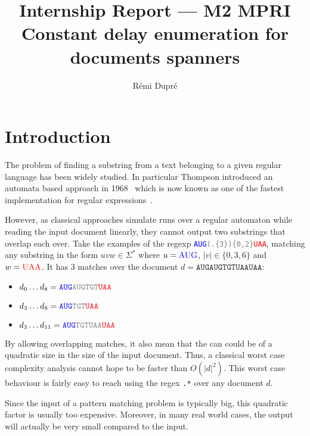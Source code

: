 \documentclass[12px]{article}
\title{%
  Internship Report --- M2 MPRI \\
  Constant delay enumeration for documents spanners
}
\author{Rémi Dupré}
\begin{document}
  \maketitle

  
  \pagebreak


  \section{Introduction}

    The problem of finding a substring from a text belonging to a given
    regular language has been widely studied. In particular Thompson
    introduced an automata based approach in
    1968~\cite{thompson1968programming} which is now known as one of the
    fastest implementation for regular expressions~\cite{cox2007regular}.

    However, as classical approaches simulate runs over a regular automaton
    while reading the input document linearly, they cannot output two
    substrings that overlap each over. Take the examples of the regexp
    \texttt{\textcolor{blue}{AUG}\textcolor{gray}{(.\{3\})\{0,2\}}\textcolor{red}{UAA}},
    matching any substring in the form $uvw \in \Sigma^*$ where $u =
    \text{\textcolor{blue}{AUG}}$, $|v| \in \{0, 3, 6\}$ and $w =
    \text{\textcolor{red}{UAA}}$. It has 3 matches over the document $d =
    \texttt{AUGAUGTGTUAAUAA}$:
    \begin{itemize}
      \item $d_0 \ldots d_8 =
        \texttt{\textcolor{blue}{AUG}\textcolor{gray}{AUGTGT}\textcolor{red}{UAA}}$
      \item $d_3 \ldots d_8 =
        \texttt{\textcolor{blue}{AUG}\textcolor{gray}{TGT}\textcolor{red}{UAA}}$
      \item $d_3 \ldots d_{11} =
        \texttt{\textcolor{blue}{AUG}\textcolor{gray}{TGTUAA}\textcolor{red}{UAA}}$
    \end{itemize}

    By allowing overlapping matches, it also mean that the can could be of
    a quadratic size in the size of the input document. Thus, a classical
    worst case complexity analysis cannot hope to be faster than $O(|d|^2)$.
    This worst case behaviour is fairly easy to reach using the regex
    \texttt{.*} over any document $d$.

    Since the input of a pattern matching problem is typically big, this
    quadratic factor is usually too expensive. Moreover, in many real world
    cases, the output will actually be very small compared to the input.
\end{document}
